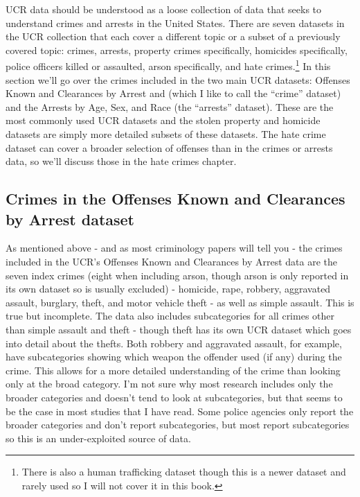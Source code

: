 \documentclass[
  12pt,
  openany]{book}
\begin{document}
UCR data should be understood as a loose collection of data that seeks to understand crimes and arrests in the United States. There are seven datasets in the UCR collection that each cover a different topic or a subset of a previously covered topic: crimes, arrests, property crimes specifically, homicides specifically, police officers killed or assaulted, arson specifically, and hate crimes.\footnote{There is also a human trafficking dataset though this is a newer dataset and rarely used so I will not cover it in this book.} In this section we'll go over the crimes included in the two main UCR datasets: Offenses Known and Clearances by Arrest and (which I like to call the ``crime'' dataset) and the Arrests by Age, Sex, and Race (the ``arrests'' dataset). These are the most commonly used UCR datasets and the stolen property and homicide datasets are simply more detailed subsets of these datasets. The hate crime dataset can cover a broader selection of offenses than in the crimes or arrests data, so we'll discuss those in the hate crimes chapter.

\hypertarget{crimes-in-the-offenses-known-and-clearances-by-arrest-dataset}{%
\subsection{Crimes in the Offenses Known and Clearances by Arrest dataset}\label{crimes-in-the-offenses-known-and-clearances-by-arrest-dataset}}

As mentioned above - and as most criminology papers will tell you - the crimes included in the UCR's Offenses Known and Clearances by Arrest data are the seven index crimes (eight when including arson, though arson is only reported in its own dataset so is usually excluded) - homicide, rape, robbery, aggravated assault, burglary, theft, and motor vehicle theft - as well as simple assault. This is true but incomplete. The data also includes subcategories for all crimes other than simple assault and theft - though theft has its own UCR dataset which goes into detail about the thefts. Both robbery and aggravated assault, for example, have subcategories showing which weapon the offender used (if any) during the crime. This allows for a more detailed understanding of the crime than looking only at the broad category. I'm not sure why most research includes only the broader categories and doesn't tend to look at subcategories, but that seems to be the case in most studies that I have read. Some police agencies only report the broader categories and don't report subcategories, but most report subcategories so this is an under-exploited source of data.
\end{document}
